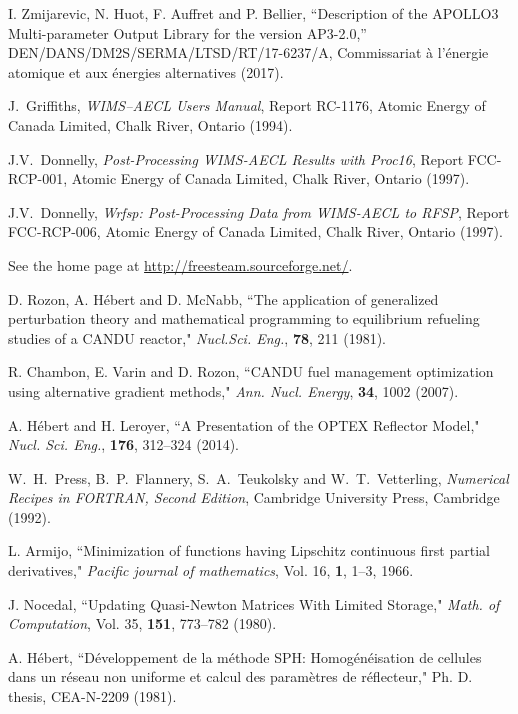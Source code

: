 \begin{thebibliography}{99}
I. Zmijarevic, N. Huot, F. Auffret and P. Bellier, ``Description of the APOLLO3 Multi-parameter Output Library for the
version AP3-2.0,'' DEN/DANS/DM2S/SERMA/LTSD/RT/17-6237/A, Commissariat \`a l'\'energie atomique et aux \'energies alternatives (2017).

J.~Griffiths,  
\textsl{WIMS--AECL Users Manual},
Report RC-1176, Atomic Energy of Canada Limited, Chalk River, Ontario (1994).

J.V.~Donnelly,  
\textsl{Post-Processing WIMS-AECL Results with Proc16},
Report FCC-RCP-001, Atomic Energy of Canada Limited, Chalk River, Ontario (1997).

J.V.~Donnelly,  
\textsl{Wrfsp: Post-Processing Data from WIMS-AECL to RFSP},
Report FCC-RCP-006, Atomic Energy of Canada Limited, Chalk River, Ontario (1997).

See the home page at \url{http://freesteam.sourceforge.net/}.

D. Rozon, A. H\'ebert and D. McNabb, ``The application of generalized perturbation theory and mathematical programming
to equilibrium refueling studies of a CANDU reactor," {\sl Nucl.Sci. Eng.}, {\bf 78}, 211 (1981).

R. Chambon, E. Varin and D. Rozon, ``CANDU fuel management optimization using alternative gradient
methods," {\sl Ann. Nucl. Energy}, {\bf 34}, 1002 (2007).

A. H\'ebert and H. Leroyer, ``A Presentation of the OPTEX Reflector Model," {\sl Nucl. Sci. Eng.},  {\bf 176}, 312--324 (2014).

W.~H.~Press, B.~P.~Flannery, S.~A.~Teukolsky and W.~T.~Vetterling, {\sl Numerical Recipes in FORTRAN, Second Edition}, Cambridge University Press, Cambridge (1992).

L. Armijo, ``Minimization of functions having Lipschitz continuous
first partial derivatives," {\sl Pacific journal of mathematics}, Vol. 16,
{\bf 1}, 1--3, 1966.

J. Nocedal, ``Updating Quasi-Newton Matrices With Limited Storage," {\sl Math. of Computation}, Vol. 35, {\bf 151}, 773--782 (1980).

A. H\'ebert, ``D\'eveloppement de la m\'ethode SPH: Homog\'en\'eisation de cellules dans un r\'eseau non uniforme et calcul des param\`etres de r\'eflecteur," Ph. D. thesis, CEA-N-2209 (1981).


\end{thebibliography}
